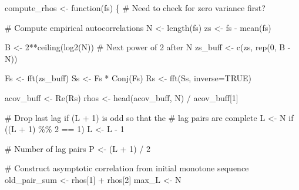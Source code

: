 \documentclass[
  letterpaper,
  DIV=11,
  numbers=noendperiod]{scrartcl}
\newenvironment{Shaded}{\begin{snugshade}}{\end{snugshade}}
\newcommand{\AttributeTok}[1]{\textcolor[rgb]{0.40,0.45,0.13}{#1}}
\newcommand{\CommentTok}[1]{\textcolor[rgb]{0.37,0.37,0.37}{#1}}
\newcommand{\ConstantTok}[1]{\textcolor[rgb]{0.56,0.35,0.01}{#1}}
\newcommand{\ControlFlowTok}[1]{\textcolor[rgb]{0.00,0.23,0.31}{#1}}
\newcommand{\DecValTok}[1]{\textcolor[rgb]{0.68,0.00,0.00}{#1}}
\newcommand{\FunctionTok}[1]{\textcolor[rgb]{0.28,0.35,0.67}{#1}}
\newcommand{\NormalTok}[1]{\textcolor[rgb]{0.00,0.23,0.31}{#1}}
\newcommand{\OtherTok}[1]{\textcolor[rgb]{0.00,0.23,0.31}{#1}}
\newcommand{\SpecialCharTok}[1]{\textcolor[rgb]{0.37,0.37,0.37}{#1}}
\begin{document}
\begin{Shaded}
\begin{Highlighting}[]
\NormalTok{compute\_rhos }\OtherTok{\textless{}{-}} \ControlFlowTok{function}\NormalTok{(fs) \{}
  \CommentTok{\# Need to check for zero variance first?}

  \CommentTok{\# Compute empirical autocorrelations}
\NormalTok{  N }\OtherTok{\textless{}{-}} \FunctionTok{length}\NormalTok{(fs)}
\NormalTok{  zs }\OtherTok{\textless{}{-}}\NormalTok{ fs }\SpecialCharTok{{-}} \FunctionTok{mean}\NormalTok{(fs)}

\NormalTok{  B }\OtherTok{\textless{}{-}} \DecValTok{2}\SpecialCharTok{**}\FunctionTok{ceiling}\NormalTok{(}\FunctionTok{log2}\NormalTok{(N)) }\CommentTok{\# Next power of 2 after N}
\NormalTok{  zs\_buff }\OtherTok{\textless{}{-}} \FunctionTok{c}\NormalTok{(zs, }\FunctionTok{rep}\NormalTok{(}\DecValTok{0}\NormalTok{, B }\SpecialCharTok{{-}}\NormalTok{ N))}

\NormalTok{  Fs }\OtherTok{\textless{}{-}} \FunctionTok{fft}\NormalTok{(zs\_buff)}
\NormalTok{  Ss }\OtherTok{\textless{}{-}}\NormalTok{ Fs }\SpecialCharTok{*} \FunctionTok{Conj}\NormalTok{(Fs)}
\NormalTok{  Rs }\OtherTok{\textless{}{-}} \FunctionTok{fft}\NormalTok{(Ss, }\AttributeTok{inverse=}\ConstantTok{TRUE}\NormalTok{)}

\NormalTok{  acov\_buff }\OtherTok{\textless{}{-}} \FunctionTok{Re}\NormalTok{(Rs)}
\NormalTok{  rhos }\OtherTok{\textless{}{-}} \FunctionTok{head}\NormalTok{(acov\_buff, N) }\SpecialCharTok{/}\NormalTok{ acov\_buff[}\DecValTok{1}\NormalTok{]}

  \CommentTok{\# Drop last lag if (L + 1) is odd so that the}
  \CommentTok{\# lag pairs are complete}
\NormalTok{  L }\OtherTok{\textless{}{-}}\NormalTok{ N}
  \ControlFlowTok{if}\NormalTok{ ((L }\SpecialCharTok{+} \DecValTok{1}\NormalTok{) }\SpecialCharTok{\%\%} \DecValTok{2} \SpecialCharTok{==} \DecValTok{1}\NormalTok{)}
\NormalTok{    L }\OtherTok{\textless{}{-}}\NormalTok{ L }\SpecialCharTok{{-}} \DecValTok{1}

  \CommentTok{\# Number of lag pairs}
\NormalTok{  P }\OtherTok{\textless{}{-}}\NormalTok{ (L }\SpecialCharTok{+} \DecValTok{1}\NormalTok{) }\SpecialCharTok{/} \DecValTok{2}

  \CommentTok{\# Construct asymptotic correlation from initial monotone sequence}
\NormalTok{  old\_pair\_sum }\OtherTok{\textless{}{-}}\NormalTok{ rhos[}\DecValTok{1}\NormalTok{] }\SpecialCharTok{+}\NormalTok{ rhos[}\DecValTok{2}\NormalTok{]}
\NormalTok{  max\_L }\OtherTok{\textless{}{-}}\NormalTok{ N}


\end{Highlighting}
\end{Shaded}
\end{document}
